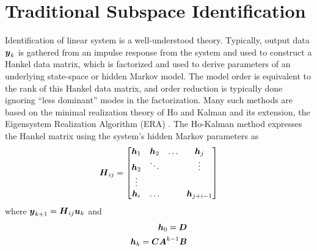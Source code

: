\section{Traditional Subspace Identification}
Identification of linear system is a well-understood theory.  Typically, output data $\vb*{y}_{k}$ is gathered from an impulse response from the system and used to construct a Hankel data matrix, which is factorized and used to derive parameters of an underlying state-space or hidden Markov model.  The model order is equivalent to the rank of this Hankel data matrix, and order reduction is typically done ignoring ``less dominant'' modes in the factorization.  Many such methods are based on the minimal realization theory of Ho and Kalman \cite{ho1966effective} and its extension, the Eigensystem Realization Algorithm (ERA) \cite{juang1985eigensystem}.  The Ho-Kalman method expresses the Hankel matrix using the system's hidden Markov parameters as
\begin{equation}
\label{eq:hankel_matrix}
\begin{aligned}
    \vb*{H}_{ij} = 
    \begin{bmatrix}
        \vb*{h}_{1} & \vb*{h}_{2} & \ldots & \vb*{h}_{j}\\
        \vb*{h}_{2} & \ddots &  & \vdots\\
        \vdots & & & \\
        \vb*{h}_{i} & \ldots &  & \vb*{h}_{j+i-1}
    \end{bmatrix}
\end{aligned}
\end{equation}
where $\vb*{y}_{k+1} = \vb*{H}_{ij}\vb*{u}_{k}$ and
\begin{equation}
\label{eq:markov_params}
\begin{aligned}
    \vb*{h}_{0} = \vb*{D}\\
    \vb*{h}_{k} = \vb*{C}\vb*{A}^{k-1}\vb*{B}
\end{aligned}
\end{equation}

